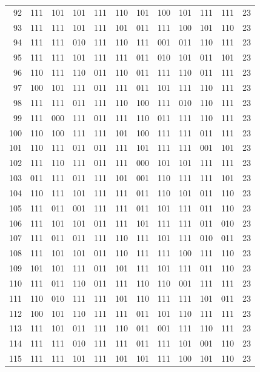 \begin{longtable}{r*{10}{c}r}
92 & 111 & 101 & 101 & 111 & 110 & 101 & 100 & 101 & 111 & 111 & 23\\
93 & 111 & 111 & 101 & 111 & 101 & 011 & 111 & 100 & 101 & 110 & 23\\
94 & 111 & 111 & 010 & 111 & 110 & 111 & 001 & 011 & 110 & 111 & 23\\
95 & 111 & 111 & 101 & 111 & 111 & 011 & 010 & 101 & 011 & 101 & 23\\
96 & 110 & 111 & 110 & 011 & 110 & 011 & 111 & 110 & 011 & 111 & 23\\
97 & 100 & 101 & 111 & 011 & 111 & 011 & 101 & 111 & 110 & 111 & 23\\
98 & 111 & 111 & 011 & 111 & 110 & 100 & 111 & 010 & 110 & 111 & 23\\
99 & 111 & 000 & 111 & 011 & 111 & 110 & 011 & 111 & 110 & 111 & 23\\
100 & 110 & 100 & 111 & 111 & 101 & 100 & 111 & 111 & 011 & 111 & 23\\
101 & 110 & 111 & 011 & 011 & 111 & 101 & 111 & 111 & 001 & 101 & 23\\
102 & 111 & 110 & 111 & 011 & 111 & 000 & 101 & 101 & 111 & 111 & 23\\
103 & 011 & 111 & 011 & 111 & 101 & 001 & 110 & 111 & 111 & 101 & 23\\
104 & 110 & 111 & 101 & 111 & 111 & 011 & 110 & 101 & 011 & 110 & 23\\
105 & 111 & 011 & 001 & 111 & 111 & 011 & 101 & 111 & 011 & 110 & 23\\
106 & 111 & 101 & 101 & 011 & 111 & 101 & 111 & 111 & 011 & 010 & 23\\
107 & 111 & 011 & 011 & 111 & 110 & 111 & 101 & 111 & 010 & 011 & 23\\
108 & 111 & 101 & 101 & 011 & 110 & 111 & 111 & 100 & 111 & 110 & 23\\
109 & 101 & 101 & 111 & 011 & 101 & 111 & 101 & 111 & 011 & 110 & 23\\
110 & 111 & 011 & 110 & 011 & 111 & 110 & 110 & 001 & 111 & 111 & 23\\
111 & 110 & 010 & 111 & 111 & 101 & 110 & 111 & 111 & 101 & 011 & 23\\
112 & 100 & 101 & 110 & 111 & 111 & 011 & 101 & 110 & 111 & 111 & 23\\
113 & 111 & 101 & 011 & 111 & 110 & 011 & 001 & 111 & 110 & 111 & 23\\
114 & 111 & 111 & 010 & 111 & 111 & 011 & 111 & 101 & 001 & 110 & 23\\
115 & 111 & 111 & 101 & 111 & 101 & 101 & 111 & 100 & 101 & 110 & 23\\

\end{longtable}
